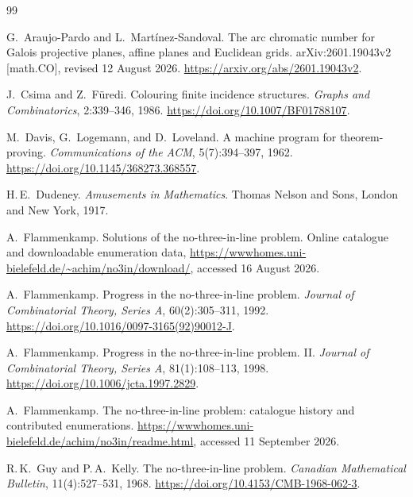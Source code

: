 \documentclass[11pt]{article}
\theoremstyle{definition}
\theoremstyle{remark}
\begin{document}
\begin{thebibliography}{99}
\small
\setlength{\itemsep}{2pt}
\setlength{\parsep}{0pt}

G.~Araujo-Pardo and L.~Mart\'{i}nez-Sandoval.
\newblock The arc chromatic number for {Galois} projective planes, affine
  planes and {Euclidean} grids.
\newblock arXiv:2601.19043v2 [math.CO], revised 12 August 2026.
\newblock \url{https://arxiv.org/abs/2601.19043v2}.

J.~Csima and Z.~F\"uredi.
\newblock Colouring finite incidence structures.
\newblock \emph{Graphs and Combinatorics}, 2:339--346, 1986.
\newblock \url{https://doi.org/10.1007/BF01788107}.

M.~Davis, G.~Logemann, and D.~Loveland.
\newblock A machine program for theorem-proving.
\newblock \emph{Communications of the ACM}, 5(7):394--397, 1962.
\newblock \url{https://doi.org/10.1145/368273.368557}.

H.\,E.~Dudeney.
\newblock \emph{Amusements in Mathematics}.
\newblock Thomas Nelson and Sons, London and New York, 1917.

A.~Flammenkamp.
\newblock Solutions of the no-three-in-line problem.
\newblock Online catalogue and downloadable enumeration data,
  \url{https://wwwhomes.uni-bielefeld.de/~achim/no3in/download/}, accessed
  16 August 2026.

A.~Flammenkamp.
\newblock Progress in the no-three-in-line problem.
\newblock \emph{Journal of Combinatorial Theory, Series A}, 60(2):305--311,
  1992.
\newblock \url{https://doi.org/10.1016/0097-3165(92)90012-J}.

A.~Flammenkamp.
\newblock Progress in the no-three-in-line problem. {II}.
\newblock \emph{Journal of Combinatorial Theory, Series A}, 81(1):108--113,
  1998.
\newblock \url{https://doi.org/10.1006/jcta.1997.2829}.

A.~Flammenkamp.
\newblock The no-three-in-line problem: catalogue history and contributed
  enumerations.
\newblock \url{https://wwwhomes.uni-bielefeld.de/achim/no3in/readme.html},
  accessed 11 September 2026.
  
R.\,K.~Guy and P.\,A.~Kelly.
\newblock The no-three-in-line problem.
\newblock \emph{Canadian Mathematical Bulletin}, 11(4):527--531, 1968.
\newblock \url{https://doi.org/10.4153/CMB-1968-062-3}.


\end{thebibliography}
\end{document}

